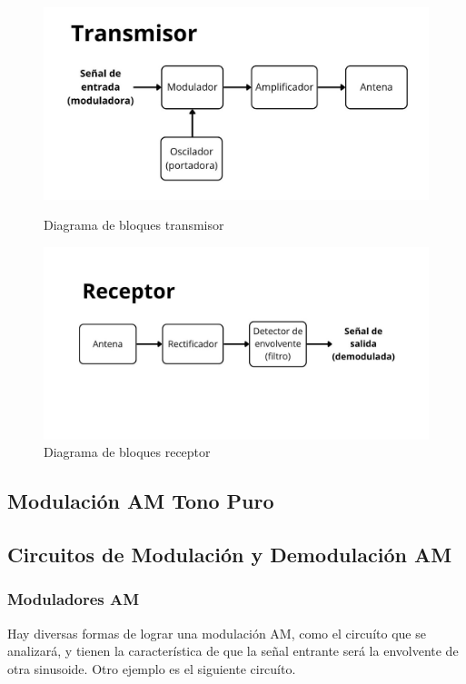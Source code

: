 \begin{figure}[ht!]
    \centering
    \begin{minipage}{0.48\linewidth}
        \centering
        \includegraphics[width=0.95\linewidth]{img/transmisor.jpg}
        \caption{Diagrama de bloques transmisor}
        \label{fig:bloques_transmisor}
    \end{minipage}\hfill
    \begin{minipage}{0.48\linewidth}
        \centering
        \includegraphics[width=0.95\linewidth]{img/receptor.jpg}
        \caption{Diagrama de bloques receptor}
        \label{fig:bloques_receptor}
    \end{minipage}
\end{figure}

\subsection{Modulación AM Tono Puro}
\subsection{Circuitos de Modulación y Demodulación AM}

\subsubsection{Moduladores AM}
Hay diversas formas de lograr una modulación AM, como el circuíto que se analizará, y tienen la característica de que la señal entrante será la envolvente de otra sinusoide. Otro ejemplo es el siguiente circuíto.

